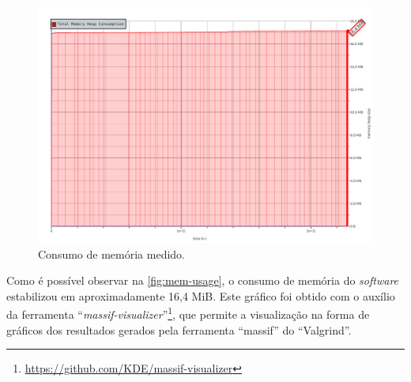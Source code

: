 \begin{figure}[!ht]
    \begin{center}
        \includegraphics[width=\textwidth]{figures/mem-usage.pdf}
        \caption{Consumo de memória medido.}
        \label{fig:mem-usage}
    \end{center}
\end{figure}

Como é possível observar na \autoref{fig:mem-usage}, o consumo de memória do \textit{software} estabilizou em aproximadamente 16,4 MiB. Este gráfico foi obtido com o auxílio da ferramenta ``\textit{massif-visualizer}''\footnote{\href{https://github.com/KDE/massif-visualizer}{https://github.com/KDE/massif-visualizer}}, que permite a visualização na forma de gráficos dos resultados gerados pela ferramenta ``massif'' do ``Valgrind''.
